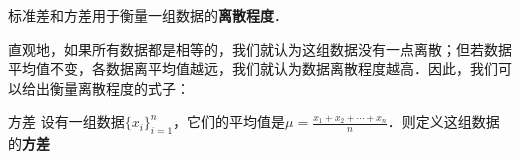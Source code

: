


标准差和方差用于衡量一组数据的\textbf{离散程度}．

直观地，如果所有数据都是相等的，我们就认为这组数据没有一点离散；但若数据平均值不变，各数据离平均值越远，我们就认为数据离散程度越高．因此，我们可以给出衡量离散程度的式子：

\begin{definition}{方差}
设有一组数据$\{x_i\}_{i=1}^n$，它们的平均值是$\mu=\frac{x_1+x_2+\cdots+x_n}{n}$．则定义这组数据的\textbf{方差}
\end{definition}



























